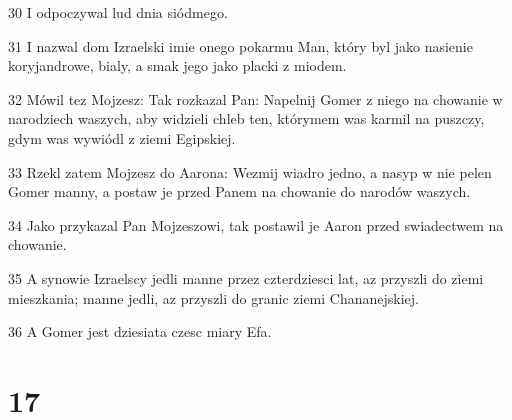 \par 30 I odpoczywal lud dnia siódmego.
\par 31 I nazwal dom Izraelski imie onego pokarmu Man, który byl jako nasienie koryjandrowe, bialy, a smak jego jako placki z miodem.
\par 32 Mówil tez Mojzesz: Tak rozkazal Pan: Napelnij Gomer z niego na chowanie w narodziech waszych, aby widzieli chleb ten, którymem was karmil na puszczy, gdym was wywiódl z ziemi Egipskiej.
\par 33 Rzekl zatem Mojzesz do Aarona: Wezmij wiadro jedno, a nasyp w nie pelen Gomer manny, a postaw je przed Panem na chowanie do narodów waszych.
\par 34 Jako przykazal Pan Mojzeszowi, tak postawil je Aaron przed swiadectwem na chowanie.
\par 35 A synowie Izraelscy jedli manne przez czterdziesci lat, az przyszli do ziemi mieszkania; manne jedli, az przyszli do granic ziemi Chananejskiej.
\par 36 A Gomer jest dziesiata czesc miary Efa.

\chapter{17}

